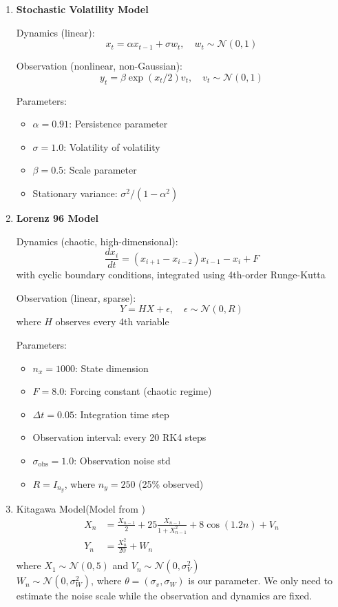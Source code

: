 \documentclass{article}
\begin{document}
\begin{enumerate}
\item \textbf{Stochastic Volatility Model}

Dynamics (linear):
\[ x_t = \alpha x_{t-1} + \sigma w_t, \quad w_t \sim \mathcal{N}(0, 1) \]

Observation (nonlinear, non-Gaussian):
\[ y_t = \beta \exp(x_t/2) v_t, \quad v_t \sim \mathcal{N}(0, 1) \]

Parameters:
\begin{itemize}
\item $\alpha = 0.91$: Persistence parameter
\item $\sigma = 1.0$: Volatility of volatility
\item $\beta = 0.5$: Scale parameter
\item Stationary variance: $\sigma^2/(1 - \alpha^2)$
\end{itemize}

\item \textbf{Lorenz 96 Model}

Dynamics (chaotic, high-dimensional):
\[ \frac{dx_i}{dt} = (x_{i+1} - x_{i-2}) x_{i-1} - x_i + F \]
with cyclic boundary conditions, integrated using 4th-order Runge-Kutta

Observation (linear, sparse):
\[ Y = H X + \epsilon, \quad \epsilon \sim \mathcal{N}(0, R) \]
where $H$ observes every 4th variable

Parameters:
\begin{itemize}
\item $n_x = 1000$: State dimension
\item $F = 8.0$: Forcing constant (chaotic regime)
\item $\Delta t = 0.05$: Integration time step
\item Observation interval: every 20 RK4 steps
\item $\sigma_{\text{obs}} = 1.0$: Observation noise std
\item $R = I_{n_y}$, where $n_y = 250$ (25\% observed)
\end{itemize}
\item Kitagawa Model(Model from \cite{Andrieu2010})
\begin{equation}
\begin{split}
X_n &= \frac{X_{n-1}}{2} + 25 \frac{X_{n-1}}{1 + X_{n-1}^2} + 8 \cos(1.2n) + V_n \\
Y_n &= \frac{X_n^2}{20} + W_n \\
\end{split}
\end{equation}
where $ X_1 \sim \mathcal{N}(0, 5)$ and
$ V_n \sim \mathcal{N}(0, \sigma_V^2)$ \\
$ W_n \sim \mathcal{N}(0, \sigma_W^2)$, where $\theta=(\sigma_v,\sigma_W)$ is our parameter. We only need to estimate the noise scale while the observation and dynamics are fixed.


\end{enumerate}
\end{document}
